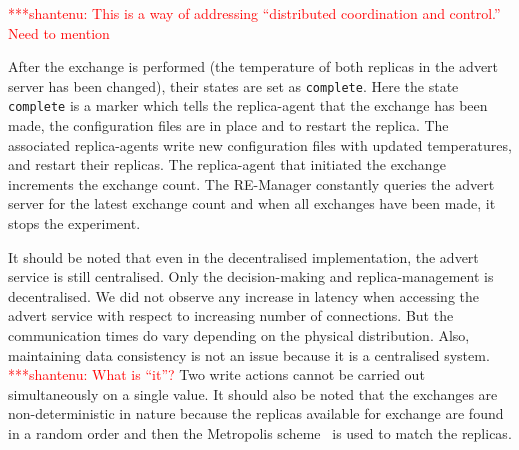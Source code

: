 \documentclass{rspublic}
\newcommand{\jhanote}[1]{ {\textcolor{red} { ***shantenu: #1 }}}
\newcommand{\alnote}[1]{ {\textcolor{blue} { ***andre: #1 }}}
\newcommand{\athotanote}[1]{ {\textcolor{green} { ***athota: #1 }}}
\newcommand{\alnote}[1]{}
\newcommand{\athotanote}[1]{}
\newcommand{\jhanote}[1]{}
\begin{document}
\jhanote{This is a way of addressing ``distributed coordination
  and control.'' Need to mention}


After the exchange is performed (the temperature of both replicas in
the advert server has been changed), their states are set as
\texttt{complete}. Here the state \texttt{complete} is a marker
which tells the replica-agent that the exchange has been made, the
configuration files are in place and to restart the replica.  
The associated replica-agents write new
configuration files with updated temperatures, and restart their
replicas. The replica-agent that initiated the exchange increments the
exchange count. The RE-Manager constantly queries the advert server
for the latest exchange count and when all exchanges have been made,
it stops the experiment.

It should be noted that even in the decentralised implementation, the
advert service is still centralised. Only the decision-making and
replica-management is decentralised. We did not observe any increase
in latency when accessing the advert service with respect to
increasing number of connections.  %
But the communication times do vary depending on the physical
distribution. Also, maintaining data consistency is not an issue
because it is a centralised system.  \jhanote{What is ``it''?}Two
write actions cannot be carried out simultaneously on a single value.
It should also be noted that the exchanges are non-deterministic in
nature because the replicas available for exchange are found in a
random order and then the Metropolis scheme~\citep{metropolis:1087} is
used to match the replicas.

\end{document}
